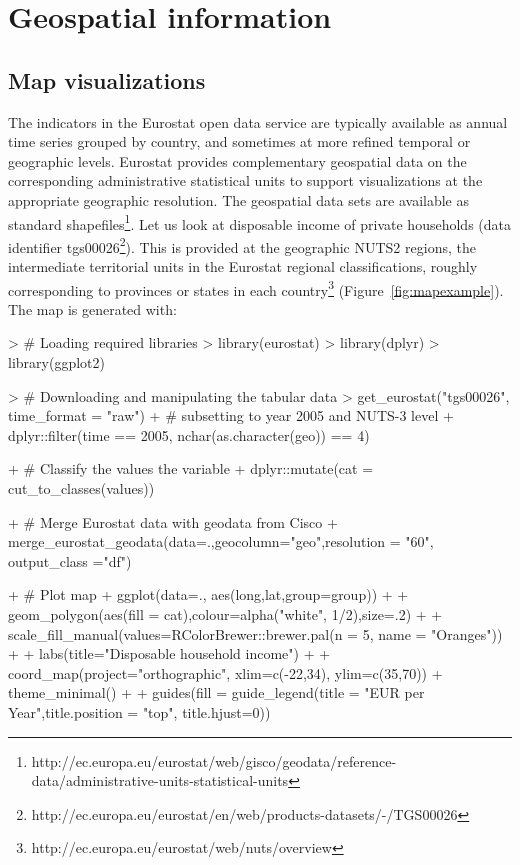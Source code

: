 


\section{Geospatial information}

\subsection{Map visualizations}

The indicators in the Eurostat open data service are typically
available as annual time series grouped by country, and sometimes at
more refined temporal or geographic levels. Eurostat provides
complementary geospatial data on the corresponding administrative
statistical units to support visualizations at the appropriate
geographic resolution. The geospatial data sets are available as
standard
shapefiles\footnote{http://ec.europa.eu/eurostat/web/gisco/geodata/reference-data/administrative-units-statistical-units}. Let
us look at disposable income of private households (data identifier
tgs00026\footnote{http://ec.europa.eu/eurostat/en/web/products-datasets/-/TGS00026}). This
is provided at the geographic NUTS2 regions, the intermediate
territorial units in the Eurostat regional classifications, roughly
corresponding to provinces or states in each
country\footnote{http://ec.europa.eu/eurostat/web/nuts/overview}
(Figure~\ref{fig:mapexample}). The map is generated with:

\begin{example}
> # Loading required libraries
> library(eurostat)
> library(dplyr)
> library(ggplot2)

> # Downloading and manipulating the tabular data
> get_eurostat("tgs00026", time_format = "raw") %
+   # subsetting to year 2005 and NUTS-3 level
+   dplyr::filter(time == 2005, nchar(as.character(geo)) == 4) %

+   # Classify the values the variable
+   dplyr::mutate(cat = cut_to_classes(values)) %

+   # Merge Eurostat data with geodata from Cisco
+   merge_eurostat_geodata(data=.,geocolumn="geo",resolution = "60", output_class ="df") %

+   # Plot map
+   ggplot(data=., aes(long,lat,group=group)) +
+   geom_polygon(aes(fill = cat),colour=alpha("white", 1/2),size=.2) +
+   scale_fill_manual(values=RColorBrewer::brewer.pal(n = 5, name = "Oranges")) +
+   labs(title="Disposable household income") +
+   coord_map(project="orthographic", xlim=c(-22,34), ylim=c(35,70)) + theme_minimal() +
+   guides(fill = guide_legend(title = "EUR per Year",title.position = "top", title.hjust=0))
\end{example}


